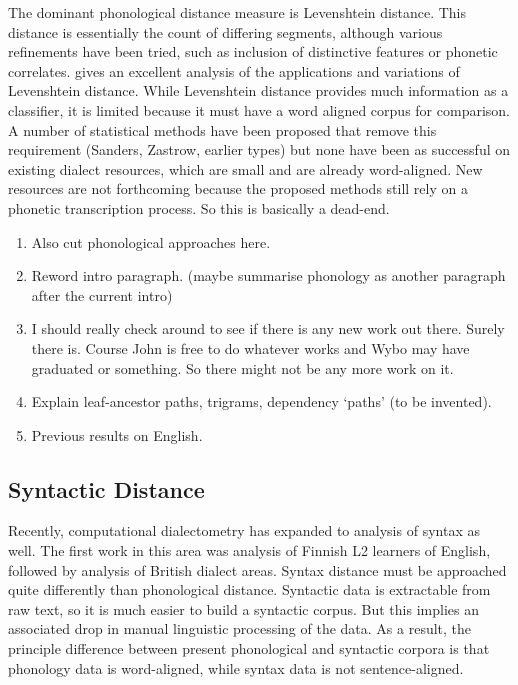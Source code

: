 \documentclass[11pt]{article}
\begin{document}
The dominant phonological distance measure is Levenshtein
distance. This distance is essentially the count of differing
segments, although various refinements have been tried, such as
inclusion of distinctive features or phonetic
correlates.  gives an excellent analysis of the
applications and variations of Levenshtein distance. While Levenshtein
distance provides much information as a classifier, it is limited
because it must have a word aligned corpus for comparison. A number of
statistical methods have been proposed that remove this requirement
(Sanders, Zastrow, earlier types) but none have been as successful on
existing dialect resources, which are small and are already
word-aligned. New resources are not forthcoming because the proposed
methods still rely on a phonetic transcription process. So this is
basically a dead-end.

\begin{enumerate}
\item Also cut phonological approaches here.
\item Reword intro paragraph. (maybe summarise phonology as another
  paragraph after the current intro)
\item I should really check around to see if there is any new work out
  there. Surely there is. Course John is free to do whatever works and
  Wybo may have graduated or something. So there might not be any more
  work on it.
\item Explain leaf-ancestor paths, trigrams, dependency `paths' (to be
  invented).
\item Previous results on English.
\end{enumerate}

\subsection{Syntactic  Distance}
Recently, computational dialectometry has expanded to analysis of
syntax as well. The first work in this area was 
analysis of Finnish L2 learners of English, followed by
 analysis of British dialect areas. Syntax
distance must be approached quite differently than phonological
distance. Syntactic data is extractable from raw text, so it is much
easier to build a syntactic corpus. But this implies an associated
drop in manual linguistic processing of the data. As a result, the
principle difference between present phonological and syntactic
corpora is that phonology data is word-aligned, while syntax data is
not sentence-aligned.
\end{document}
